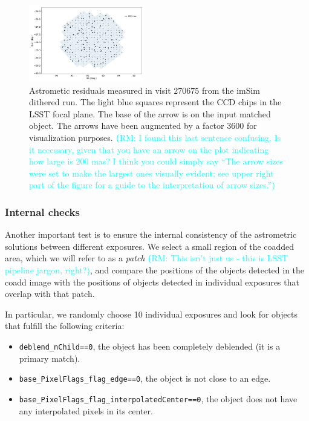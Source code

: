 \documentclass[twocolumn]{aastex62}
\newcommand{\rachel}[1]{{\textcolor{cyan}{{\textbf (RM: #1)}}}}
\begin{document}
\begin{figure}
  \centering
  \includegraphics[width=0.45\textwidth]{astrometry_imsim_dithered_interp}
  \caption{Astrometic residuals measured in visit $270675$ from the imSim dithered run. The light blue squares represent the CCD chips in
  the LSST focal plane. The base of the arrow is on the input matched object. The arrows have been augmented by a factor 3600 for visualization purposes. \rachel{I found this last sentence confusing.  Is it necessary, given that you have an arrow on the plot indicating how large is 200 mas?  I think  you could simply say ``The arrow sizes were set to make the largest ones visually evident; see upper right part of the figure for a guide to the interpretation of arrow sizes.''}}
  \label{fig:astrometry_c}
\end{figure}


\subsubsection{Internal checks}
\label{sec:internal_astrometry}

Another important test is to ensure the internal consistency of the astrometric solutions between different exposures. We select
a small region of the coadded area, which we will refer to as a \textit{patch} \rachel{This isn't just us - this is LSST pipeline jargon, right?}, and compare the positions of the objects detected in the coadd
image with the positions of objects detected in individual exposures that overlap with that patch.

In particular, we randomly choose 10 individual exposures and look for objects that fulfill the following criteria:
\begin{itemize}
  \item \texttt{deblend\_nChild==0}, the object has been completely deblended (it is a primary match).
  \item \texttt{base\_PixelFlags\_flag\_edge==0}, the object is not close to an edge.
  \item \texttt{base\_PixelFlags\_flag\_interpolatedCenter==0}, the object does not have any interpolated pixels in its center.
\end{itemize}
\end{document}
